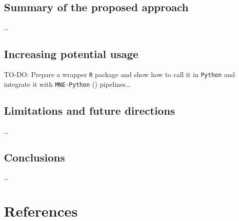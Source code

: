 \documentclass[
  doc,
  floatsintext,
  longtable,
  a4paper,
  nolmodern,
  notxfonts,
  notimes,
  colorlinks=true,linkcolor=blue,citecolor=blue,urlcolor=blue]{apa7}
\begin{document}
\subsection{Summary of the proposed
approach}\label{summary-of-the-proposed-approach}

\ldots{}

\subsection{Increasing potential
usage}\label{increasing-potential-usage}

TO-DO: Prepare a wrapper \texttt{R} package and show how to call it in
\texttt{Python} and integrate it with \texttt{MNE-Python}
() pipelines\ldots{}

\subsection{Limitations and future
directions}\label{limitations-and-future-directions}

\ldots{}

\subsection{Conclusions}\label{conclusions}

\ldots{}

\newpage

\section{References}\label{references}
\end{document}
